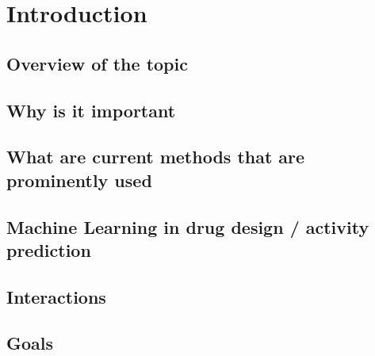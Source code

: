 \chapter{Introduction}\label{cha:Introduction}



\section{Overview of the topic}
\section{Why is it important}
\section{What are current methods that are prominently used}
\section{Machine Learning in drug design / activity prediction}
\section{Interactions}
\section{Goals}

